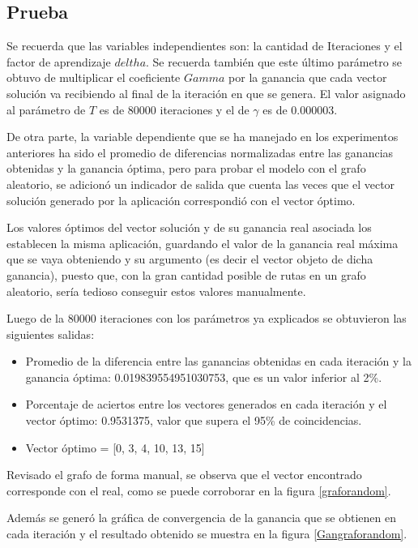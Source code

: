 \subsection{Prueba}

Se recuerda que las variables independientes son: la cantidad de Iteraciones y el factor de aprendizaje $deltha$. Se recuerda también que este último parámetro se obtuvo de multiplicar el coeficiente $Gamma$ por la ganancia que cada vector solución va recibiendo al final de la iteración en que se genera. El valor asignado al parámetro de $T$ es de 80000 iteraciones y el de $\gamma$ es de 0.000003. 

De otra parte, la variable dependiente que se ha manejado en los experimentos anteriores ha sido el promedio de diferencias normalizadas entre las ganancias obtenidas y la ganancia óptima, pero para probar el modelo con el grafo aleatorio, se adicionó un indicador de salida que cuenta las veces que el vector solución generado por la aplicación correspondió con el vector óptimo.

Los valores óptimos del vector solución y de su ganancia real asociada los establecen la misma aplicación, guardando el valor de la ganancia real máxima que se vaya obteniendo y su argumento (es decir el vector objeto de dicha ganancia), puesto que, con la gran cantidad posible de rutas en un grafo aleatorio, sería tedioso conseguir estos valores manualmente.

Luego de la 80000 iteraciones con los parámetros ya explicados se obtuvieron las siguientes salidas:

\begin{itemize}
\item Promedio de la diferencia entre las ganancias obtenidas en cada iteración y la ganancia óptima: 0.019839554951030753, que es un valor inferior al 2\%.
\item Porcentaje de aciertos entre los vectores generados en cada iteración y el vector óptimo: 0.9531375, valor que supera el 95\% de coincidencias.
\item Vector óptimo = [0, 3, 4, 10, 13, 15]
\end{itemize}

Revisado el grafo de forma manual, se observa que el vector encontrado corresponde con el real, como se puede corroborar en la figura \ref{graforandom}.

Además se generó la gráfica de convergencia de la ganancia que se obtienen en cada iteración y el resultado obtenido se muestra en la figura \ref{Gangraforandom}.

